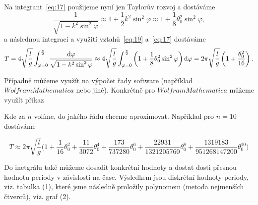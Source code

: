 \documentclass[reqno, a4paper]{amsart}
\begin{document}
Na integrant~\eqref{eq:17} použijeme nyní jen Taylorův rozvoj a dostáváme
\begin{equation}
  \label{eq:19}
  \frac{1}
  {
    \sqrt{1 - k^2 \sin^2 \varphi}
  }
  \approx
  1
  +
  \frac{1}{2}
  k^2
  \sin^2 \varphi
  \approx
  1
  +
  \frac{1}{8}
  \theta_{0}^2
  \sin^2 \varphi
  ,
\end{equation}
a následnou integrací a využití vztahů~\eqref{eq:19} a~\eqref{eq:17} dostáváme
\begin{equation}
  \label{eq:20}
  T
  =
  4
  \sqrt{
    \frac{l}{g}
  }
  \int_{\varphi=0}^{\frac{\pi}{2}}
  \frac{\mathrm{d} \varphi}
  {
    \sqrt{1 - k^2 \sin^2 \varphi}
  }
  \approx
  4
  \sqrt{
    \frac{l}{g}
  }
  \int_{\varphi=0}^{\frac{\pi}{2}}
  \left(
    1
    +
    \frac{1}{8}
    \theta_{0}^2
    \sin^2 \varphi
  \right)
  \mathrm{d} \varphi
  =
  2\pi
  \sqrt{\frac{l}{g}}
  \left(
    1
    +
    \frac{\theta_{0}^2}{16}
  \right)
  .
\end{equation}

Případně můžeme využít na výpočet řady software (například $ Wolfram Mathematica $ nebo jiné). Konkrétně pro $ Wolfram Mathematica $ můžeme využít příkaz

\begin{verbatim*}
	
	k=Sin[\[Theta]/2]
	Series[1/(Sqrt[1-k^2*(Sin[x])^2]),{\[Theta],0,4}]
	Integrate[4*Sqrt[l/g]*Series[1/(Sqrt[1-k^2*(Sin[x])^2]),{\[Theta],0,n}],{x,0,Pi/2}]
	
\end{verbatim*}

Kde za $ n $ volíme, do jakého řádu chceme aproximovat. Například pro $ n=10 $ dostáváme

\begin{equation*}
  T
  \approx
 2 \pi \sqrt{\frac{l}{g}} \bigg(  1 +\frac{1}{16}\theta_{0} ^2+\frac{11}{3072}\theta_{0} ^4+\frac{173}{737280} \theta_{0} ^6 +\frac{22931}{1321205760} \theta_{0} ^8 
+\frac{1319183}{951268147200} \theta_{0} ^{10} \bigg)
\end{equation*}

Do inetgrálu také můžeme dosadit konkrétní hodnoty a dostat dosti přesnou hodnotu periody v závislosti na čase. Výsledkem jsou diskrétní hodnoty periody, viz. tabulka (1), které jsme následně proložily polynomem (metoda nejmenších čtverců), viz. graf (2). 

\vspace{5mm}
\end{document}

